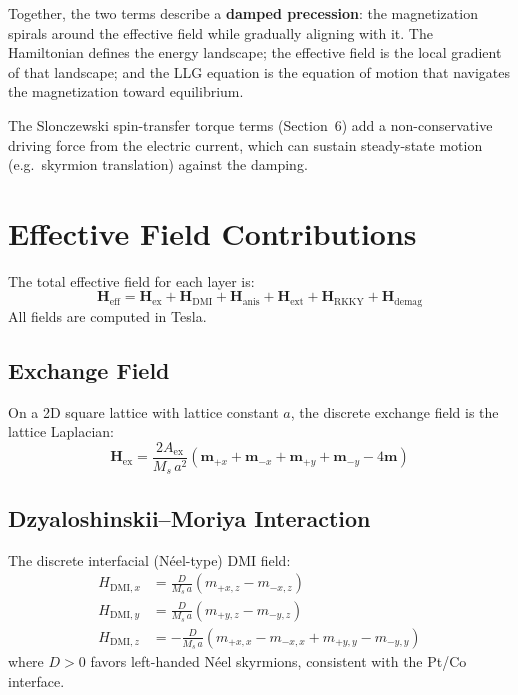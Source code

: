 \documentclass[11pt,a4paper]{article}
\newcommand{\mb}[1]{\mathbf{#1}}
\newcommand{\Heff}{\mb{H}_{\text{eff}}}
\newcommand{\Hex}{\mb{H}_{\text{ex}}}
\newcommand{\Hdmi}{\mb{H}_{\text{DMI}}}
\newcommand{\Hanis}{\mb{H}_{\text{anis}}}
\newcommand{\Hdemag}{\mb{H}_{\text{demag}}}
\newcommand{\Hrkky}{\mb{H}_{\text{RKKY}}}
\newcommand{\Hext}{\mb{H}_{\text{ext}}}
\newcommand{\Aex}{A_{\text{ex}}}
\newcommand{\Ms}{M_s}
\begin{document}
Together, the two terms describe a \textbf{damped precession}:
the magnetization spirals around the effective field while
gradually aligning with it.  The Hamiltonian defines the energy
landscape; the effective field is the local gradient of that
landscape; and the LLG equation is the equation of motion that
navigates the magnetization toward equilibrium.

The Slonczewski spin-transfer torque terms (Section~6) add a
non-conservative driving force from the electric current, which
can sustain steady-state motion (e.g.\ skyrmion translation)
against the damping.


\section{Effective Field Contributions}
\label{sec:effective_fields}

The total effective field for each layer is:
%
\begin{equation}
\Heff = \Hex + \Hdmi + \Hanis + \Hext + \Hrkky + \Hdemag
\end{equation}
%
All fields are computed in Tesla.

\subsection{Exchange Field}

On a 2D square lattice with lattice constant $a$, the discrete
exchange field is the lattice Laplacian:
%
\begin{equation}
\Hex = \frac{2\Aex}{\Ms \, a^2}
    \left(
        \mb{m}_{+x} + \mb{m}_{-x}
        + \mb{m}_{+y} + \mb{m}_{-y}
        - 4\mb{m}
    \right)
\end{equation}

\subsection{Dzyaloshinskii--Moriya Interaction}

The discrete interfacial (N\'{e}el-type) DMI field:
%
\begin{align}
H_{\text{DMI},x} &= \frac{D}{\Ms \, a}
    (m_{+x,z} - m_{-x,z}) \\
H_{\text{DMI},y} &= \frac{D}{\Ms \, a}
    (m_{+y,z} - m_{-y,z}) \\
H_{\text{DMI},z} &= -\frac{D}{\Ms \, a}
    (m_{+x,x} - m_{-x,x} + m_{+y,y} - m_{-y,y})
\end{align}
%
where $D > 0$ favors left-handed N\'{e}el skyrmions, consistent with
the Pt/Co interface.
\end{document}

